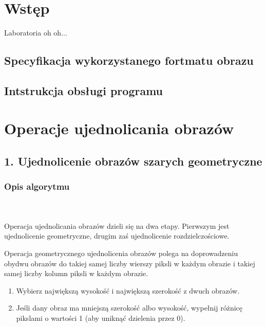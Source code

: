 \documentclass[final,a4paper,openany,12pt]{mwbk}
\begin{document}
\tableofcontents
\listoffigures

\sloppy


\chapter {Wstęp}

Laboratoria oh oh...~\cite{BookMok} %


\section {Specyfikacja wykorzystanego fortmatu obrazu}

\section {Intstrukcja obsługi programu}



\chapter{Operacje ujednolicania obrazów}
\newpage

\section*{1. Ujednolicenie obrazów szarych geometryczne}
\subsection*{Opis algorytmu}
\hfill
\\\\
\indent Operacja ujednolicania obrazów dzieli się na dwa etapy. Pierwszym jest ujednolicenie geometryczne, drugim zaś ujednolicenie rozdzielczościowe.

Operacja geometrycznego ujednolicenia obrazów polega na doprowadzeniu obydwu obrazów do takiej samej liczby wierszy piksli w każdym obrazie i takiej samej liczby kolumn piksli w każdym obrazie.
\begin{enumerate}
	\item Wybierz największą wysokość i największą szerokość z dwuch obrazów.\\
	\item Jeśli dany obraz ma mniejszą szerokość albo wysokość, wypełnij różnicę pikslami o wartości 1 (aby uniknąć dzielenia przez 0).
\end{enumerate}
\end{document}

